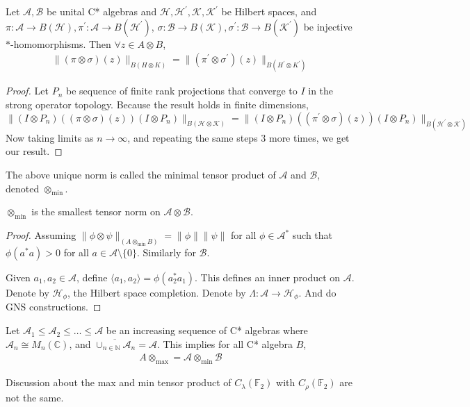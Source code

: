 

\begin{theorem}
  Let $\mathcal{A, B}$ be unital C* algebras and $\mathcal{H,
  H^\prime, K, K^\prime}$ be Hilbert spaces, and $\pi: \mathcal{A}
  \to B(\mathcal{H}), \pi^\prime: \mathcal{A} \to
  B(\mathcal{H}^\prime)$, $\sigma: \mathcal{B} \to B(\mathcal{K}),
  \sigma^\prime: \mathcal{B}\to B(\mathcal{K}^\prime)$ be injective
  $*$-homomorphisms. Then $\forall z \in A \otimes B$,
  \begin{align*}
    \|(\pi \otimes \sigma)(z)\|_{B(H \otimes K)} = \|(\pi^\prime
    \otimes \sigma^\prime)(z)\|_{B(H^\prime \otimes K^\prime)}
  \end{align*}
\end{theorem}
\begin{proof}
  Let $P_n$ be sequence of finite rank projections that converge to
  $I$ in the strong operator topology. Because the result holds in
  finite dimensions, $$\|(I \otimes P_n)((\pi
  \otimes \sigma)(z))(I \otimes P_n)\|_{B(\mathcal{H} \otimes
  \mathcal{K})} = \|(I \otimes P_n)((\pi^\prime
  \otimes \sigma)(z))(I \otimes P_n)\|_{B(\mathcal{H}^\prime
  \otimes \mathcal{K})}$$
  Now taking limits as $ n \to \infty$, and repeating the same steps
  3 more times, we get our result.
\end{proof}

\begin{definition}
  The above unique norm is called the minimal tensor product of
  $\mathcal{A}$ and $\mathcal{B}$, denoted $\otimes_{\textrm{min}}$.
\end{definition}

\begin{theorem}
  $\otimes_{\textrm{min}}$ is the smallest tensor norm on
  $\mathcal{A} \otimes \mathcal{B}$.
\end{theorem}
\begin{proof}
  Assuming $\|\phi \otimes \psi\|_{(A \otimes_{\textrm{min}} B)} = \|
  \phi\| \|\psi\|$ for all $\phi \in \mathcal{A}^*$ such that
  $\phi(a^*a) > 0$ for all $a \in \mathcal{A}\setminus \{ 0 \}$.
  Similarly for $\mathcal{B}$.

  Given $a_1, a_2 \in \mathcal{A}$, define $  \langle a_1 , a_2
  \rangle  = \phi(a_2^*a_1)$. This defines an inner product on
  $\mathcal{A}$. Denote by $\mathcal{H}_{\phi}$, the Hilbert space
  completion. Denote by $\Lambda: \mathcal{A} \to \mathcal{H}_\phi$.
  And do GNS constructions.
\end{proof}

Let $\mathcal{A}_1 \leqslant \mathcal{A}_2 \leqslant \ldots \leqslant
\mathcal{A}$ be an increasing sequence of C* algebras where
$\mathcal{A}_n \cong M_n(\mathbb{C})$, and $  \overline{\cup_{n \in
\mathbb{N}}\mathcal{A}_n} = \mathcal{A}$. This implies for all C* algebra $B$,
\begin{align*}
  A \otimes_{\max} = \mathcal{A} \otimes_{\min} \mathcal{B}
\end{align*}

Discussion about the max and min tensor product of
$C_\lambda(\mathbb{F}_2)$ with $C_\rho(\mathbb{F}_2)$ are not the same.
